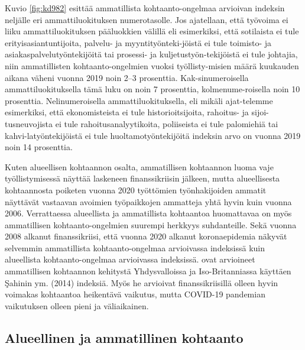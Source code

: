 \documentclass[12pt]{article}
\begin{document}
Kuvio \ref{fig:kd982} esittää ammatillista kohtaanto-ongelmaa arvioivan indeksin neljälle eri ammattiluokituksen numerotasolle. Jos ajatellaan, että työvoima ei liiku ammattiluokituksen pääluokkien välillä eli esimerkiksi, että sotilaista ei tule erityisasiantuntijoita, palvelu- ja myyntityönteki-jöistä ei tule toimisto- ja asiakaspalvelutyöntekijöitä tai prosessi- ja kuljetustyön-tekijöistä ei tule johtajia, niin ammatillisten kohtaanto-ongelmien vuoksi työllisty-misien määrä kuukauden aikana väheni vuonna 2019 noin 2–3 prosenttia. Kak-sinumeroisella ammattiluokituksella tämä luku on noin 7 prosenttia, kolmenume-roisella noin 10 prosenttia. Nelinumeroisella ammattiluokituksella, eli mikäli ajat-telemme esimerkiksi, että ekonomisteista ei tule historioitsijoita, rahoitus- ja sijoi-tusneuvojista ei tule rahoitusanalyytikoita, poliiseista ei tule palomiehiä tai kahvi-latyöntekijöistä ei tule huoltamotyöntekijöitä indeksin arvo on vuonna 2019 noin 14 prosenttia.

Kuten alueellisen kohtaannon osalta, ammatillisen kohtaannon luoma vaje työllistymisessä näyttää laskeneen finanssikriisin jälkeen, mutta alueellisesta kohtaannosta poiketen vuonna 2020 työttömien työnhakijoiden ammatit näyttävät vastaavan avoimien työpaikkojen ammatteja yhtä hyvin kuin vuonna 2006. Verrattaessa alueellista ja ammatillista kohtaantoa huomattavaa on myös ammatillisen kohtaanto-ongelmien suurempi herkkyys suhdanteille. Sekä vuonna 2008 alkanut finanssikriisi, että vuonna 2020 alkanut koronaepidemia näkyvät selvemmin ammatillista kohtaanto-ongelmaa arvioivassa indeksissä kuin alueellista kohtaanto-ongelmaa arvioivassa indeksissä.  ovat arvioineet ammatillisen kohtaannon kehitystä Yhdysvalloissa ja Iso-Britanniassa käyttäen {\c{S}}ahinin ym. (2014) indeksiä. Myös he arvioivat finanssikriisillä olleen hyvin voimakas kohtaantoa heikentävä vaikutus, mutta COVID-19 pandemian vaikutuksen olleen pieni ja väliaikainen. 


\subsection{Alueellinen ja ammatillinen kohtaanto} \label{section:alueellinen ja ammatillinen kohtaanto}
\end{document}
